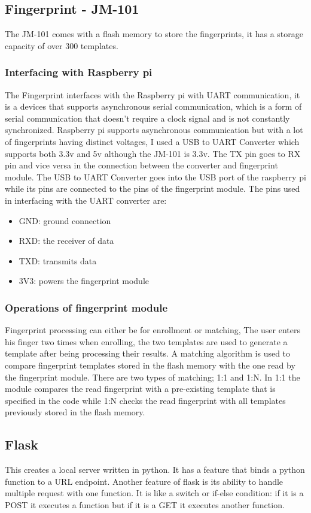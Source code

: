 \subsection{Fingerprint - JM-101}
The JM-101 comes with a flash memory to store the fingerprints, it has a storage capacity of over 300 templates. 
\subsubsection{Interfacing with Raspberry pi}
The Fingerprint interfaces with the Raspberry pi with UART communication, it is a devices that supports asynchronous serial communication, which is a form of serial communication that doesn't require a clock signal and is not constantly synchronized. Raspberry pi supports asynchronous communication but with a lot of fingerprints having distinct voltages, I used a USB to UART Converter which supports both 3.3v and 5v although the JM-101 is 3.3v. The TX pin goes to RX pin and vice versa in the connection between the converter and fingerprint module. The USB to UART Converter goes into the USB port of the raspberry pi while its pins are connected to the pins of the fingerprint module.
The pins used in interfacing with the UART converter are:
\begin{itemize}
  \item GND: ground connection
  \item RXD: the receiver of data
  \item TXD: transmits data
  \item 3V3: powers the fingerprint module
\end{itemize}

\subsubsection{Operations of fingerprint module}
Fingerprint processing can either be for enrollment or matching, The user enters his finger two times when enrolling, the two templates are used to generate a template after being processing their results. 
A matching algorithm is used to compare fingerprint templates stored in the flash memory with the one read by the fingerprint module. There are two types of matching; 1:1 and 1:N. In 1:1 the module compares the read fingerprint with a pre-existing template that is specified in the code while 1:N checks the read fingerprint with all templates previously stored in the flash memory.


\subsection{Flask}
This creates a local server written in python. It has a feature that binds a python function to a URL endpoint. Another feature of flask is its ability to handle multiple request with one function. It is like a switch or if-else condition: if it is a POST it executes a function but if it is a GET it executes another function.

